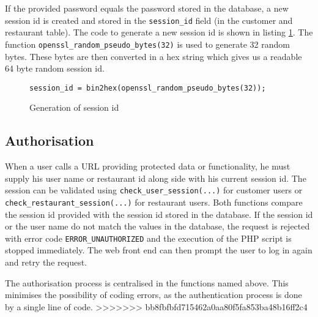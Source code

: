 If the provided password equals the password stored in the database, a new session id is created and stored in the \texttt{session\_id} field (in the customer and restaurant table). The code to generate a new session id is shown in listing \ref{security_session_id}. The function \texttt{openssl\_random\_pseudo\_bytes(32)} is used to generate 32 random bytes. These bytes are then converted in a hex string which gives us a readable 64 byte random session id.

\begin{figure}
\lstset{language=php}
\begin{lstlisting}
session_id = bin2hex(openssl_random_pseudo_bytes(32));
\end{lstlisting}
\caption{Generation of session id}
\label{security_session_id}
\end{figure}

\subsection{Authorisation}
When a user calls a URL providing protected data or functionality, he must supply his user name or restaurant id along side with his current session id. The session can be validated using \texttt{check\_user\_session(...)} for customer users or \texttt{check\_restaurant\_session(...)} for restaurant users. Both functions compare the session id provided with the session id stored in the database. If the session id or the user name do not match the values in the database, the request is rejected with error code \texttt{ERROR\_UNAUTHORIZED} and the execution of the PHP script is stopped immediately. The web front end can then prompt the user to log in again and retry the request.

The authorisation process is centralised in the functions named above. This minimises the possibility of coding errors, as the authentication process is done by a single line of code.
>>>>>>> bb8fbfbfd715462a0aa80f5fa853ba48b16ff2c4
